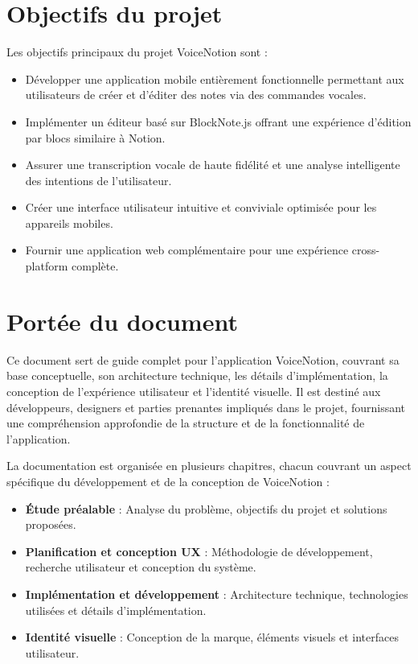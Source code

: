 \vspace{1cm}

\section*{Objectifs du projet}

Les objectifs principaux du projet VoiceNotion sont :

\begin{itemize}
    \item Développer une application mobile entièrement fonctionnelle permettant aux utilisateurs de créer et d'éditer des notes via des commandes vocales.
    \item Implémenter un éditeur basé sur BlockNote.js offrant une expérience d'édition par blocs similaire à Notion.
    \item Assurer une transcription vocale de haute fidélité et une analyse intelligente des intentions de l'utilisateur.
    \item Créer une interface utilisateur intuitive et conviviale optimisée pour les appareils mobiles.
    \item Fournir une application web complémentaire pour une expérience cross-platform complète.
\end{itemize}

\vspace{1cm}

\section*{Portée du document}

Ce document sert de guide complet pour l'application VoiceNotion, couvrant sa base conceptuelle, son architecture technique, les détails d'implémentation, la conception de l'expérience utilisateur et l'identité visuelle. Il est destiné aux développeurs, designers et parties prenantes impliqués dans le projet, fournissant une compréhension approfondie de la structure et de la fonctionnalité de l'application.

La documentation est organisée en plusieurs chapitres, chacun couvrant un aspect spécifique du développement et de la conception de VoiceNotion :

\begin{itemize}
    \item \textbf{Étude préalable} : Analyse du problème, objectifs du projet et solutions proposées.
    \item \textbf{Planification et conception UX} : Méthodologie de développement, recherche utilisateur et conception du système.
    \item \textbf{Implémentation et développement} : Architecture technique, technologies utilisées et détails d'implémentation.
    \item \textbf{Identité visuelle} : Conception de la marque, éléments visuels et interfaces utilisateur.
\end{itemize}

